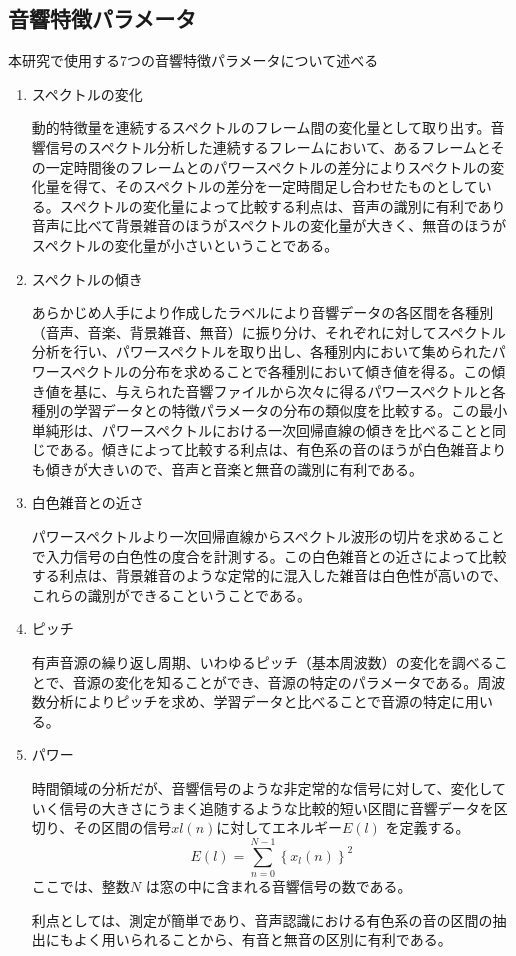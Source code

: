 \subsection{音響特徴パラメータ}
本研究で使用する7つの音響特徴パラメータについて述べる\cite{shimae_10}

\begin{enumerate}
\item スペクトルの変化\par
動的特徴量を連続するスペクトルのフレーム間の変化量として取り出す。音響信号のスペクトル分析した連続するフレームにおいて、あるフレームとその一定時間後のフレームとのパワースペクトルの差分によりスペクトルの変化量を得て、そのスペクトルの差分を一定時間足し合わせたものとしている。スペクトルの変化量によって比較する利点は、音声の識別に有利であり音声に比べて背景雑音のほうがスペクトルの変化量が大きく、無音のほうがスペクトルの変化量が小さいということである。

\item スペクトルの傾き\par
あらかじめ人手により作成したラベルにより音響データの各区間を各種別（音声、音楽、背景雑音、無音）に振り分け、それぞれに対してスペクトル分析を行い、パワースペクトルを取り出し、各種別内において集められたパワースペクトルの分布を求めることで各種別において傾き値を得る。この傾き値を基に、与えられた音響ファイルから次々に得るパワースペクトルと各種別の学習データとの特徴パラメータの分布の類似度を比較する。この最小単純形は、パワースペクトルにおける一次回帰直線の傾きを比べることと同じである。傾きによって比較する利点は、有色系の音のほうが白色雑音よりも傾きが大きいので、音声と音楽と無音の識別に有利である。

\item 白色雑音との近さ\par
パワースペクトルより一次回帰直線からスペクトル波形の切片を求めることで入力信号の白色性の度合を計測する。この白色雑音との近さによって比較する利点は、背景雑音のような定常的に混入した雑音は白色性が高いので、これらの識別ができるこということである。

\item ピッチ\par
有声音源の繰り返し周期、いわゆるピッチ（基本周波数）の変化を調べることで、音源の変化を知ることができ、音源の特定のパラメータである。周波数分析によりピッチを求め、学習データと比べることで音源の特定に用いる。

\item パワー\par
時間領域の分析だが、音響信号のような非定常的な信号に対して、変化していく信号の大きさにうまく追随するような比較的短い区間に音響データを区切り、その区間の信号$xl(n)$に対してエネルギー$E(l)$ を定義する\cite{shimae_11}。
\begin{equation}
E(l)=\sum_{n=0}^{N-1}\left\{x_l(n)\right\}^2
\end{equation}
ここでは、整数$N$ は窓の中に含まれる音響信号の数である。\par
利点としては、測定が簡単であり、音声認識における有色系の音の区間の抽出にもよく用いられることから、有音と無音の区別に有利である。


\end{enumerate}

